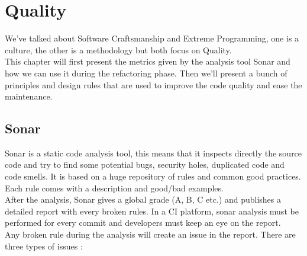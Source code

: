 \section{Quality}\label{sec:quality}
We've talked about Software Craftsmanship and Extreme Programming,
one is a culture, the other is a methodology but both focus on Quality.
\\
This chapter will first present the metrics given by the analysis
tool Sonar and how we can use it during the refactoring phase.
Then we'll present a bunch of principles and design rules that
are used to improve the code quality and ease the maintenance.

\subsection{Sonar}\label{subsec:sonar}
Sonar is a static code analysis tool, this means that it inspects
directly the source code and try to find some potential bugs, security
holes, duplicated code and code smells.
It is based on a huge repository of rules and common good practices.
Each rule comes with a description and good/bad examples. \\
After the analysis, Sonar gives a global grade (A, B, C etc.) and
publishes a detailed report with every broken rules.
In a CI platform, sonar analysis must be performed for every commit and
developers must keep an eye on the report. \\
\newline
Any broken rule during the analysis will create an issue in the report.
There are three types of issues :

